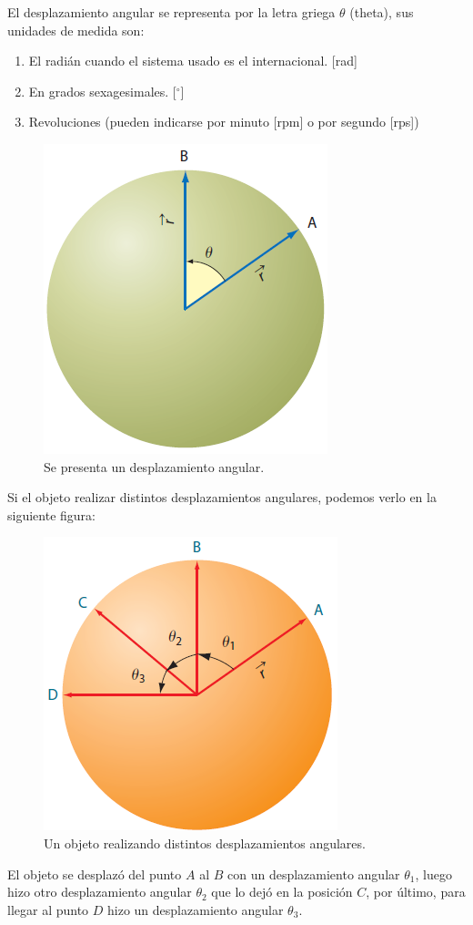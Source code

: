 \documentclass[14pt]{extarticle}
\begin{document}
\begin{enumerate}
El desplazamiento angular se representa por la letra griega $\theta$ (theta),  sus unidades de medida son: 
\begin{enumerate}
\item El radián cuando el sistema usado es el internacional. [\unit{\radian}]
\item En grados sexagesimales. [${}^{\circ}$]
\item Revoluciones (pueden indicarse por minuto [rpm] o por segundo [rps])
\end{enumerate}
\begin{figure}[H]
    \centering
    \includegraphics[scale=0.75]{Imagenes/Movimiento_Circular_01.png}
    \caption{Se presenta un desplazamiento angular.}
\end{figure}
Si el objeto realizar distintos desplazamientos angulares, podemos verlo en la siguiente figura:
\begin{figure}[H]
    \centering
    \includegraphics[scale=0.75]{Imagenes/Movimiento_Circular_02.png}
    \caption{Un objeto realizando distintos desplazamientos angulares.}
\end{figure}
El objeto se desplazó del punto $A$ al $B$ con un desplazamiento angular $\theta_{1}$, luego hizo otro desplazamiento angular $\theta_{2}$ que lo dejó en la posición $C$, por último, para llegar al punto $D$ hizo un desplazamiento angular $\theta_{3}$.
\end{enumerate}    
    
\end{document}

